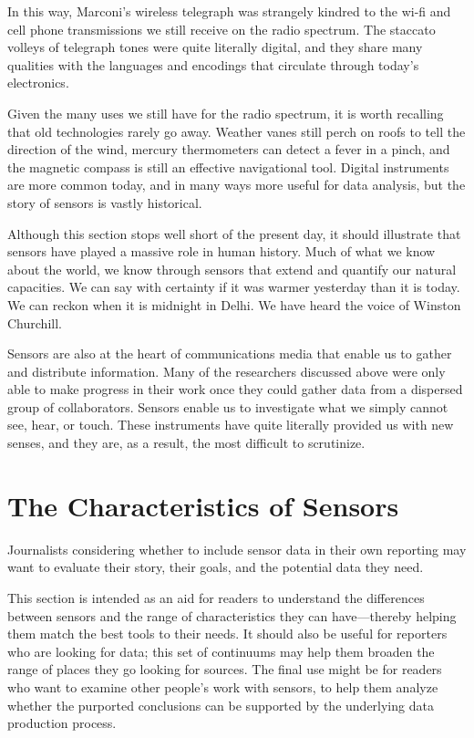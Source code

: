 In this way, Marconi's wireless telegraph was strangely kindred to the wi-fi
and cell phone transmissions we still receive on the radio spectrum. The
staccato volleys of telegraph tones were quite literally digital, and they share
many qualities with the languages and encodings that circulate through
today's electronics.

Given the many uses we still have for the radio spectrum, it is worth recalling
that old technologies rarely go away. Weather vanes still perch on roofs
to tell the direction of the wind, mercury thermometers can detect a fever
in a pinch, and the magnetic compass is still an effective navigational tool.
Digital instruments are more common today, and in many ways more useful
for data analysis, but the story of sensors is vastly historical.

Although this section stops well short of the present day, it should illustrate
that sensors have played a massive role in human history. Much of what we
know about the world, we know through sensors that extend and quantify
our natural capacities. We can say with certainty if it was warmer yesterday
than it is today. We can reckon when it is midnight in Delhi. We have heard
the voice of Winston Churchill.

Sensors are also at the heart of communications media that enable us to
gather and distribute information. Many of the researchers discussed above
were only able to make progress in their work once they could gather data from a dispersed group of collaborators. Sensors enable us to investigate
what we simply cannot see, hear, or touch. These instruments have quite
literally provided us with new senses, and they are, as a result, the most difficult
to scrutinize.

\chapter{The Characteristics of Sensors}
Journalists considering whether to include sensor data in their own reporting
may want to evaluate their story, their goals, and the potential data
they need.

This section is intended as an aid for readers to understand the differences
between sensors and the range of characteristics they can have—thereby
helping them match the best tools to their needs. It should also be useful for
reporters who are looking for data; this set of continuums may help them
broaden the range of places they go looking for sources. The final use might
be for readers who want to examine other people's work with sensors, to
help them analyze whether the purported conclusions can be supported by
the underlying data production process.


